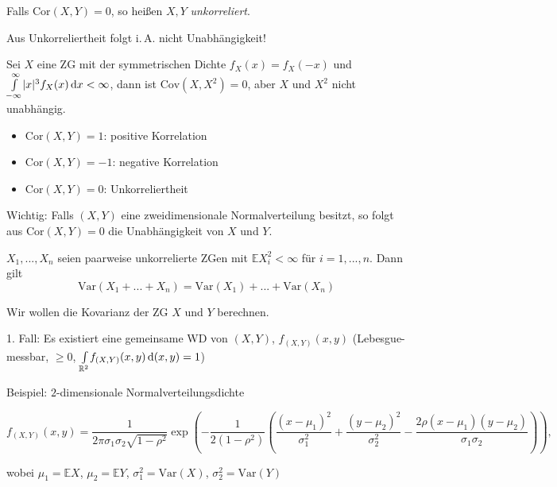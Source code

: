 \documentclass{cheat-sheet}
\newcommand{\E}{\mathbb{E}} %
\newcommand{\Var}{\mathrm{Var}} %
\newcommand{\cov}{\mathrm{Cov}} %
\newcommand{\cor}{\mathrm{Cor}} %
\begin{document}
\begin{defn}
  Falls $\cor(X, Y) = 0$, so heißen $X, Y$ \emph{unkorreliert}.
\end{defn}

\begin{acht}
  Aus Unkorreliertheit folgt i.\,A. nicht Unabhängigkeit!
\end{acht}

\begin{bsp}
  Sei $X$ eine ZG mit der symmetrischen Dichte $f_X(x) = f_X(-x)$ und ${\textstyle \int\limits_{-\infty}^{\infty}} \lvert x\rvert^3 f_X(x) \,\mathrm{d} x < \infty$, dann ist $\cov(X, X^2) = 0$, aber $X$ und $X^2$ nicht unabhängig.
\end{bsp}

\begin{bem}
  \begin{itemize}
    \item $\cor(X, Y) = 1$: positive Korrelation
    \item $\cor(X, Y) = -1$: negative Korrelation
    \item $\cor(X, Y) = 0$: Unkorreliertheit
  \end{itemize}
\end{bem}

Wichtig: Falls $(X, Y)$ eine zweidimensionale Normalverteilung besitzt, so folgt aus $\cor(X, Y) = 0$ die Unabhängigkeit von $X$ und $Y$.

\begin{satz}
  $X_1, ..., X_n$ seien paarweise unkorrelierte ZGen mit $\E X_i^2 < \infty$ für $i = 1, ..., n$. Dann gilt
  \[ \Var(X_1 + ... + X_n) = \Var(X_1) + ... + \Var(X_n) \]
\end{satz}



Wir wollen die Kovarianz der ZG $X$ und $Y$ berechnen.

1. Fall: Es existiert eine gemeinsame WD von $(X, Y)$, $f_{(X, Y)}(x, y)$ (Lebesgue-messbar, $\geq 0$, ${\textstyle \int\limits_{\mathbb{R}^2}^{}} f_{(X,Y)}(x,y) \,\mathrm{d} (x, y) = 1$)

Beispiel: $2$-dimensionale Normalverteilungsdichte

\[ f_{(X,Y)}(x,y) = \frac{1}{2 \pi \sigma_1 \sigma_2 \sqrt{1 - \rho^2}} \exp \left( - \frac{1}{2 (1 - \rho^2)} \left( \frac{(x-\mu_1)^2}{\sigma_1^2} + \frac{(y-\mu_2)^2}{\sigma_2^2} - \frac{2 \rho (x-\mu_1)(y-\mu_2)}{\sigma_1 \sigma_2} \right) \right), \]

wobei $\mu_1 = \E X$, $\mu_2 = \E Y$, $\sigma_1^2 = \Var(X)$, $\sigma_2^2 = \Var(Y)$
\end{document}

